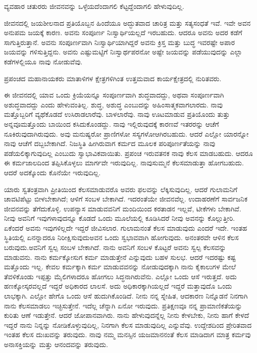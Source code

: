 ವ್ಯವಹಾರ ಚತುರರು ಜೀವನವನ್ನು ಒಳ್ಳೆಯದೆಂದಾಗಲಿ ಕೆಟ್ಟದ್ದೆಂದಾಗಲಿ ಹೇಳುವುದಿಲ್ಲ.

ಜೀವನದಲ್ಲಿ ಜಯಶೀಲನಾದ ಪ್ರತಿಯೊಬ್ಬನ ಹಿಂದೆಯೂ ಅದ್ಭುತವಾದ ಚಾರಿತ್ರ ಮತ್ತು ಸತ್ಯಸಂಧತೆ ಇವೆ. ಇವೇ ಅವನ ಅನುಪಮ ಜಯಕ್ಕೆ ಕಾರಣ. ಅವನು ಸಂಪೂರ್ಣ ನಿಃಸ್ವಾರ್ಥಿಯಲ್ಲದೆ ಇರಬಹುದು. ಆದರೂ ಅವನು ಅದರ ಕಡೆಗೆ ಸಾಗುತ್ತಿರುತ್ತಾನೆ. ಅವನು ಸಂಪೂರ್ಣವಾಗಿ ನಿಃಸ್ವಾರ್ಥಿಯಾಗಿದ್ದರೆ ಅವನು ಕ್ರಿಸ್ತ ಮತ್ತು ಬುದ್ಧ ಇವರಷ್ಟೇ ಅಪಾರ ಜಯವನ್ನು ಗಳಿಸುತ್ತಿದ್ದನು. ಅವನು ಎಷ್ಟುಮಟ್ಟಿಗೆ ನಿಃಸ್ವಾರ್ಥಪರನೋ ಅಷ್ಟೇ ಜಯವನ್ನು ಪಡೆಯುವುದನ್ನು ಎಲ್ಲಾ ಕಡೆಗಳಲ್ಲಿಯೂ ನಾವು ನೋಡುವೆವು.

ಪ್ರಪಂಚದ ಮಹಾನಾಯಕರು ಮಾತಾಳಿಗಳ ಕ್ಷೇತ್ರಗಳಿಗಿಂತ ಉತ್ತಮವಾದ ಕಾರ್ಯಕ್ಷೇತ್ರದಲ್ಲಿ ನುರಿತವರು.

ಈ ಜೀವನದಲ್ಲಿ ಯಾವ ಒಂದು ಕ್ರಿಯೆಯನ್ನೂ ಸಂಪೂರ್ಣವಾಗಿ ಶುದ್ಧವಾದದ್ದು, ಅಥವಾ ಸಂಪೂರ್ಣವಾಗಿ ಅಶುದ್ಧವಾದದ್ದು ಎಂದು ಹೇಳುವಂತಿಲ್ಲ. ಶುದ್ಧ, ಅಶುದ್ಧ ಎಂಬುದನ್ನು ಅಹಿಂಸಾತ್ಮಕವಾಗಲಾರದು. ನಾವು ಮತ್ತೊಬ್ಬರಿಗೆ ವ್ಯಥೆಕೊಡದೆ ಉಸಿರಾಡಲಾರೆವು. ಬಾಳಲಾರೆವು. ನಾವು ಊಟಮಾಡುವ ಪ್ರತಿಯೊಂದು ತುತ್ತು ಅನ್ನವೂ\break ಮತ್ತೊಂದು ಬಾಯಿಂದ ಕಸಿದುಕೊಂಡದ್ದು. ನಾವು ಇಲ್ಲಿರುವುದಕ್ಕೆ ಕಾರಣವೆ ಇತರ\-ರನ್ನು ಆಚೆಗೆ ನೂಕಿರುವುದಾಗಿರುವುದು. ಅವು ಮನುಷ್ಯರೋ ಪ್ರಾಣಿಗಳೋ ಸಸ್ಯಗಳೋ\break ಆಗಿರಬಹುದು. ಆದರೆ ಎಲ್ಲೋ ಯಾರನ್ನೋ ನಾವು ಆಚೆಗೆ ದಬ್ಬಬೇಕಾಗಿದೆ. ನಿಜಸ್ಥಿತಿ ಹೀಗಿರುವಾಗ ಕರ್ಮದ ಮೂಲಕ ಪರಿಪೂರ್ಣತೆಯನ್ನು ನಾವು ಪಡೆಯಲಿಕ್ಕಾಗುವುದಿಲ್ಲ ಎಂಬುದು ಸ್ವಾಭಾವಿಕವಾಯಿತು. ಪ್ರಪಂಚ ಇರುವತನಕ ನಾವು ಕೆಲಸ ಮಾಡಬಹುದು. ಆದರೂ ಈ ಕರ್ಮಜಾಲದಿಂದ ತಪ್ಪಿಸಿಕೊಳ್ಳಲು ಮಾರ್ಗವೇ ಇರುವುದಿಲ್ಲ. ನಾವು\break ಸುಮ್ಮನೆ ಕೆಲಸಮಾಡುತ್ತಾ ಹೋಗಬಹುದು. ಆದರೆ ಅದಕ್ಕೊಂದು ಕೊನೆಯೇ ಇರುವುದಿಲ್ಲ.

ಯಾರು ಸ್ವತಂತ್ರವಾಗಿ ಪ್ರೀತಿಯಿಂದ ಕೆಲಸಮಾಡುವರೊ ಅವರು ಫಲವನ್ನು ಲೆಕ್ಕಿಸುವುದಿಲ್ಲ. ಆದರೆ ಗುಲಾಮನಿಗೆ ಚಾವಟಿಪೆಟ್ಟು ಬೀಳಬೇಕಾಗಿದೆ; ಆಳಿಗೆ ಸಂಬಳ ಬೇಕಾಗಿದೆ. ಇದರಂತೆಯೇ ಜೀವನವೆಲ್ಲ. ಉದಾಹರಣೆಗೆ ಸಾರ್ವಜನಿಕ ಜೀವನವನ್ನು ತೆಗೆದುಕೊಳ್ಳಿ. ಉಪನ್ಯಾಸ ಮಾಡುವವನಿಗೆ ಮಂದಿಯಿಂದ ಕರತಾಡನ ಇಲ್ಲವೆ, ಟೀಕೆಗಳು ಬೇಕಾಗಿವೆ. ನೀವು ಅವನಿಗೆ ಇವುಗಳಾವುದನ್ನೂ ಕೊಡದೆ ಒಂದು ಮೂಲೆಯಲ್ಲಿ ಕೂಡಿಸಿದರೆ ನೀವು ಅವನನ್ನು ಕೊಲ್ಲುತ್ತೀರಿ. ಏಕೆಂದರೆ ಅವನು ಇವುಗಳಿಲ್ಲದೇ ಇದ್ದರೆ ಜೀವಿಸಲಾರ. ಗುಲಾಮನಂತೆ ಕೆಲಸ ಮಾಡುವುದು ಎಂದರೆ ಇದೇ. ಇಂತಹ ಸ್ಥಿತಿಯಲ್ಲಿ ಏನನ್ನಾದರೂ ನಿರೀಕ್ಷಿಸುವುದು\break ಅವನ ಒಂದು ಸ್ವಭಾವವಾಗಿ ಹೋಗುವುದು. ಅನಂತರವೇ ಆಳಿನ ಕೆಲಸ ಬರುವುದು.\break ಅವನಿಗೆ ಸ್ವಲ್ಪ ಸಂಬಳ ಬೇಕಾಗಿದೆ. ನಾನು ಅವನಿಗೆ ಸಂಬಳ ಕೊಟ್ಟರೆ ಅವನು ಸ್ವಲ್ಪ ಕೆಲಸವನ್ನು ಮಾಡುವನು. ನಾನು ಕರ್ಮಕ್ಕೋಸುಗ ಕರ್ಮ ಮಾಡುತ್ತೇನೆ ಎನ್ನುವುದು ಬಹಳ ಸುಲಭ. ಆದರೆ ಇದರಷ್ಟು ಕಷ್ಟ ಮತ್ತೊಂದು ಇಲ್ಲ. ಕೇವಲ ಕರ್ಮಕ್ಕಾಗಿ ಕರ್ಮ ಮಾಡುವವನನ್ನು ನೋಡುವುದಕ್ಕಾಗಿ ನಾನು ಕೈಕಾಲುಗಳ ಮೇಲೆ ತೆವಳಿಕೊಂಡು ಇಪ್ಪತ್ತು ಮೈಲಿಗಳಾದರೂ ಹೋಗಲು ಸಿದ್ಧನಾಗಿರುವೆನು. ಎಲ್ಲೋ ಒಂದು ಆಸೆ ಇರುತ್ತದೆ. ಅದು ಹಣಕ್ಕೋಸ್ಕರವಲ್ಲದೆ ಇದ್ದರೆ ಅಧಿಕಾರದ ಲಾಲಸೆ. ಅದು ಅಧಿಕಾರಕ್ಕಾಗಿಯಲ್ಲದೆ ಇದ್ದರೆ ಮತ್ತಾವುದೊ ಒಂದು ಲಾಭಕ್ಕಾಗಿ. ಎಲ್ಲೋ ಹೇಗೊ ಒಂದು ಆಸೆ ಹುದುಗಿಕೊಂಡಿದೆ. ನೀನು ನನ್ನ ಸ್ನೇಹಿತ, ಆದಕಾರಣ ನಿನ್ನೊಡನೆ ನಿನಗಾಗಿ ನಾನು ಕೆಲಸಮಾಡಲು ಇಚ್ಛಿಸುತ್ತೇನೆ. ಇದೆಲ್ಲ ಚೆನ್ನಾಗಿ ಏನೋ ಇರುವುದು. ಪ್ರತಿಕ್ಷಣವೂ ನನ್ನ ಪ್ರಾಮಾಣಿಕತೆಯನ್ನು ಕುರಿತು ಆಣೆ ಇಡುತ್ತೇನೆ. ಆದರೆ ಜೋಪಾನವಾಗಿರು. ನಾನು ಹೇಳುವುದನ್ನೆಲ್ಲ ನೀನು ಕೇಳಬೇಕು, ನೀನು ಹಾಗೆ ಕೇಳದೆ ಇದ್ದರೆ ನಾನು ನಿನ್ನನ್ನು ನೋಡಿಕೊಳ್ಳುವುದಿಲ್ಲ, ನಿನಗಾಗಿ ಕೆಲಸ ಮಾಡುವುದಿಲ್ಲ ಎನ್ನುವೆವು. ಉದ್ದೇಶದಿಂದ ಪ್ರೇರಿತವಾದ ಇಂತಹ ಕೆಲಸ ದುಃಖವನ್ನು ತರುವುದು. ನಾವು ನಮ್ಮ ಮನಸ್ಸಿನ ಯಜಮಾನನಂತೆ ಕೆಲಸ ಮಾಡಿದಾಗ ಮಾತ್ರ ಕರ್ಮವು ಅನಾಸಕ್ತಿಯನ್ನು ಮತ್ತು ಆನಂದವನ್ನು ತರುವುದು.

